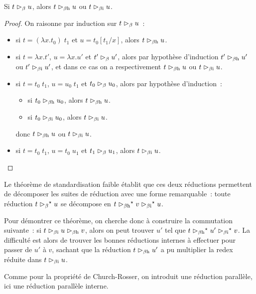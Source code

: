 \begin{proposition}
  Si $t \mathrel{\rhd_{\beta}} u$, alors $t \mathrel{\rhd_{\beta\mathrm{h}}} u$ ou $t \mathrel{\rhd_{\beta\mathrm{i}}} u$.
\end{proposition}

\begin{proof}
  On raisonne par induction sur $t \mathrel{\rhd_{\beta}} u$~:
  \begin{itemize}
  \item si $t = (\lambda x.t_0)\;t_1$ et $u = t_0[t_1/x]$, alors
    $t \mathrel{\rhd_{\beta\mathrm{h}}} u$.
  \item si $t = \lambda x.t'$, $u = \lambda x.u'$ et $t' \mathrel{\rhd_{\beta}} u'$, alors par
    hypothèse d'induction $t' \mathrel{\rhd_{\beta\mathrm{h}}} u'$ ou $t' \mathrel{\rhd_{\beta\mathrm{i}}} u'$, et dans ce cas on a
    respectivement $t \mathrel{\rhd_{\beta\mathrm{h}}} u$ ou $t \mathrel{\rhd_{\beta\mathrm{i}}} u$.
  \item si $t = t_0\;t_1$, $u = u_0\;t_1$ et $t_0 \mathrel{\rhd_{\beta}} u_0$, alors par
    hypothèse d'induction~:
    \begin{itemize}
    \item si $t_0 \mathrel{\rhd_{\beta\mathrm{h}}} u_0$, alors $t \mathrel{\rhd_{\beta\mathrm{h}}} u$.
    \item si $t_0 \mathrel{\rhd_{\beta\mathrm{i}}} u_0$, alors $t \mathrel{\rhd_{\beta\mathrm{i}}} u$.
    \end{itemize}
    donc $t\mathrel{\rhd_{\beta\mathrm{h}}} u$ ou $t \mathrel{\rhd_{\beta\mathrm{i}}} u$.
  \item si $t = t_0\;t_1$, $u = t_0\;u_1$ et $t_1\mathrel{\rhd_{\beta}} u_1$, alors
    $t \mathrel{\rhd_{\beta\mathrm{i}}} u$.\qedhere
  \end{itemize}
\end{proof}

Le théorème de standardisation faible établit que ces deux réductions permettent
de décomposer les suites de réduction avec une forme remarquable~: toute
réduction $t \mathrel{\rhd_{\beta}}^{\mathord{\star}} u$ se décompose en
$t \mathrel{\rhd_{\beta\mathrm{h}}}^{\mathord{\star}} v \mathrel{\rhd_{\beta\mathrm{i}}}^{\mathord{\star}} u$.

Pour démontrer ce théorème, on cherche donc à construire la commutation
suivante~: si $t \mathrel{\rhd_{\beta\mathrm{i}}} u \mathrel{\rhd_{\beta\mathrm{h}}} v$, alors on peut trouver $u'$ tel que
$t \mathrel{\rhd_{\beta\mathrm{h}}}^{\mathord{\star}} u' \mathrel{\rhd_{\beta\mathrm{i}}}^{\mathord{\star}} v$. La difficulté est alors de trouver les
bonnes réductions internes à effectuer pour passer de $u'$ à $v$, sachant que la
réduction $t \mathrel{\rhd_{\beta\mathrm{h}}} u'$ a pu multiplier la redex réduite dans $t \mathrel{\rhd_{\beta\mathrm{i}}} u$.

Comme pour la propriété de Church-Rosser, on introduit une réduction parallèle,
ici une réduction parallèle interne.

